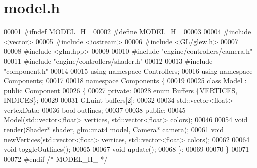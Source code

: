 \section{model.\+h}
\label{model_8h_source}

\begin{DoxyCode}
00001 \textcolor{preprocessor}{#ifndef MODEL\_H\_}
00002 \textcolor{preprocessor}{#define MODEL\_H\_}
00003 
00004 \textcolor{preprocessor}{#include <vector>}
00005 \textcolor{preprocessor}{#include <iostream>}
00006 \textcolor{preprocessor}{#include <GL/glew.h>}
00007 
00008 \textcolor{preprocessor}{#include <glm.hpp>}
00009 
00010 \textcolor{preprocessor}{#include "engine/controllers/camera.h"}
00011 \textcolor{preprocessor}{#include "engine/controllers/shader.h"}
00012 
00013 \textcolor{preprocessor}{#include "component.h"}
00014 
00015 \textcolor{keyword}{using namespace }Controllers;
00016 \textcolor{keyword}{using namespace }Components;
00017 
00018 \textcolor{keyword}{namespace }Components \{
00019     
00025     \textcolor{keyword}{class }Model : \textcolor{keyword}{public} Component
00026     \{
00027     \textcolor{keyword}{private}:
00028         \textcolor{keyword}{enum} Buffers \{VERTICES, INDICES\};
00029 
00031         GLuint buffers[2];
00032 
00034         std::vector<float> vertexData;
00036         \textcolor{keywordtype}{bool} outlines;
00037 
00038     \textcolor{keyword}{public}:
00045         Model(std::vector<float> vertices, std::vector<float> colors);
00046 
00054         \textcolor{keywordtype}{void} render(Shader* shader, glm::mat4 model, Camera* camera);
00061         \textcolor{keywordtype}{void} newVertices(std::vector<float> vertices, std::vector<float> colors);
00062 
00064         \textcolor{keywordtype}{void} toggleOutlines();
00065 
00067         \textcolor{keywordtype}{void} update();
00068     \};
00069 
00070 \}
00071 
00072 \textcolor{preprocessor}{#endif }\textcolor{comment}{/* MODEL\_H\_ */}\textcolor{preprocessor}{}
\end{DoxyCode}
